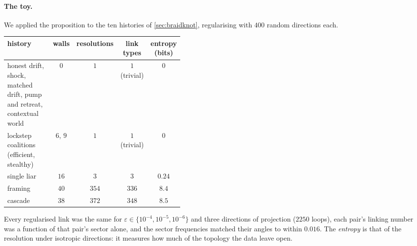\documentclass[11pt]{article}
\theoremstyle{definition}\newtheorem{definition}[theorem]{Definition}\newtheorem{remark}[theorem]{Remark}\newtheorem{example}[theorem]{Example}\newtheorem{problem}[theorem]{Open problem}\crefname{problem}{Problem}{Problems}
\begin{document}
\paragraph{The toy.} We applied the proposition to the ten histories of \cref{sec:braidknot}, regularising with $400$ random directions each.
\begin{center}\small
\begin{tabular}{@{}p{0.42\linewidth}cccc@{}}
\toprule
history & walls & resolutions & link types & entropy (bits)\\\midrule
honest drift, shock, matched drift, pump and retreat, contextual world & $0$ & $1$ & $1$ (trivial) & $0$\\
lockstep coalitions (efficient, stealthy) & $6$, $9$ & $1$ & $1$ (trivial) & $0$\\
single liar & $16$ & $3$ & $3$ & $0.24$\\
framing & $40$ & $354$ & $336$ & $8.4$\\
cascade & $38$ & $372$ & $348$ & $8.5$\\
\bottomrule
\end{tabular}
\end{center}
Every regularised link was the same for $\varepsilon\in\{10^{-4},10^{-5},10^{-6}\}$ and three directions of projection ($2250$ loops), each pair's linking number was a function of that pair's sector alone, and the sector frequencies matched their angles to within $0.016$. The \emph{entropy} is that of the resolution under isotropic directions: it measures how much of the topology the data leave open.
\end{document}

